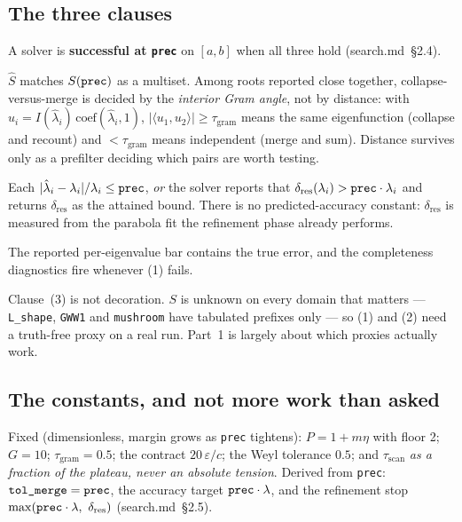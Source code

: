\documentclass[11pt]{article}
\newcommand{\file}[1]{\texttt{#1}}
\newcommand{\sm}[1]{(search.md~\S#1)}
\newcommand{\lam}{\lambda}
\begin{document}
\subsection{The three clauses}

A solver is \textbf{successful at \texttt{prec}} on $[a,b]$ when all three hold \sm{2.4}.

\begin{description}[leftmargin=2.2em,style=nextline]
\item[(1) Completeness and multiplicity.] $\hat S$ matches $S(\verb|prec|)$ as a multiset.
  Among roots reported close together, collapse-versus-merge is decided by the \emph{interior
  Gram angle}, not by distance: with $u_i = I(\hat\lam_i)\,\mathrm{coef}(\hat\lam_i,1)$,
  $|\langle u_1,u_2\rangle| \ge \tau_{\mathrm{gram}}$ means the same eigenfunction (collapse and
  recount) and $< \tau_{\mathrm{gram}}$ means independent (merge and sum). Distance survives
  only as a prefilter deciding which pairs are worth testing.
\item[(2) Accuracy.] Each $|\hat\lam_i - \lam_i|/\lam_i \le \verb|prec|$, \emph{or} the solver
  reports that $\delta_{\mathrm{res}}(\lam_i) > \verb|prec|\cdot\lam_i$ and returns
  $\delta_{\mathrm{res}}$ as the attained bound. There is no predicted-accuracy constant:
  $\delta_{\mathrm{res}}$ is measured from the parabola fit the refinement phase already
  performs.
\item[(3) Honesty.] The reported per-eigenvalue bar contains the true error, and the
  completeness diagnostics fire whenever (1) fails.
\end{description}

Clause~(3) is not decoration. $S$ is unknown on every domain that matters --- \file{L\_shape},
\file{GWW1} and \file{mushroom} have tabulated prefixes only --- so (1) and (2) need a
truth-free proxy on a real run. Part~1 is largely about which proxies actually work.

\subsection{The constants, and not more work than asked}

Fixed (dimensionless, margin grows as \verb|prec| tightens): $P = 1+m\eta$ with floor 2;
$G = 10$; $\tau_{\mathrm{gram}} = 0.5$; the contract $20\,\varepsilon/c$; the Weyl tolerance
$0.5$; and $\tau_{\mathrm{scan}}$ \emph{as a fraction of the plateau, never an absolute
tension}. Derived from \verb|prec|: $\verb|tol_merge| = \verb|prec|$, the accuracy target
$\verb|prec|\cdot\lam$, and the refinement stop
$\max(\verb|prec|\cdot\lam,\ \delta_{\mathrm{res}})$ \sm{2.5}.
\end{document}
